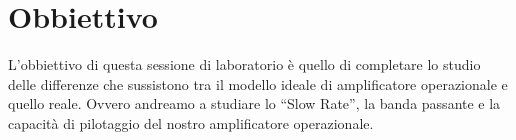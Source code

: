 \section*{Obbiettivo}

L'obbiettivo di questa sessione di laboratorio è quello di completare lo studio delle differenze che sussistono tra il modello ideale di amplificatore operazionale e quello reale.
Ovvero andreamo a studiare lo ``Slow Rate'', la banda passante e la capacità di pilotaggio del nostro amplificatore operazionale.
